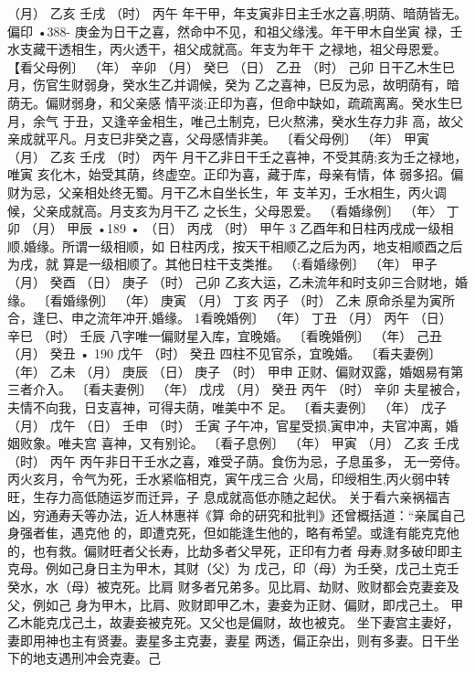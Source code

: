 （月） 乙亥
壬戌
（时） 丙午
年干甲，年支寅非日主壬水之喜,明荫、暗荫皆无。偏印
•388-
庚金为日干之喜，然命中不见，和祖父缘浅。年干甲木自坐寅
禄，壬水支藏干透相生，丙火透干，祖父成就高。年支为年干
之禄地，祖父母恩爱。
【看父母例〕
（年） 辛卯
（月） 癸巳
（日） 乙丑
（时） 己卯
日干乙木生巳月，伤官生财弱身，癸水生乙并调候，癸为
乙之喜神，巳反为忌，故明荫有，暗荫无。偏财弱身，和父亲感
情平淡;正印为喜，但命中缺如，疏疏离离。癸水生巳月，余气
于丑，又逢辛金相生，唯己土制克，巳火熬沸，癸水生存力非
高，故父亲成就平凡。月支巳非癸之喜，父母感情非美。
〔看父母例〕
（年） 甲寅
（月） 乙亥
壬戌
（时） 丙午
月干乙非日干壬之喜神，不受其荫;亥为壬之禄地，唯寅
亥化木，始受其荫，终虚空。正印为喜，藏于库，母亲有情，体
弱多招。偏财为忌，父亲相处终无蜀。月干乙木自坐长生，年
支羊刃，壬水相生，丙火调候，父亲成就高。月支亥为月干乙
之长生，父母恩爱。
（看婚缘例〕
（年〉 丁卯
（月） 甲辰
•189 •
（日） 丙戌
（时） 甲午 3
乙酉年和日柱丙戌成一级相顺,婚缘。所谓一级相顺，如
日柱丙戌，按天干相顺乙之后为丙，地支相顺酉之后为戌，就
算是一级相顺了。其他日柱干支类推。
（:看婚缘例〕
（年） 甲子
（月） 癸酉
（日） 庚子
（时） 己卯
乙亥大运，乙未流年和时支卯三合财地，婚缘。
〔看婚缘例〕
（年） 庚寅
（月） 丁亥
丙子
（时） 乙未
原命杀星为寅所合，逢巳、申之流年冲开,婚缘。
1看晚婚例〕
（年） 丁丑
（月） 丙午
（日） 辛巳
（时） 壬辰
八字唯一偏财星入库，宜晚婚。
〔看晚婚例〕
（年） 己丑
（月） 癸丑
• 190
戊午
（时） 癸丑
四柱不见官杀，宜晚婚。
〔看夫妻例〕
（年） 乙未
（月） 庚辰
（日） 庚子
（时） 甲申
正财、偏财双露，婚姻易有第三者介入。
〔看夫妻例〕
（年） 戊戌
（月） 癸丑
丙午
（时） 辛卯
夫星被合，夫情不向我，日支喜神，可得夫荫，唯美中不
足。
〔看夫妻例〕
（年） 戊子
（月） 戊午
（日） 壬申
（时） 壬寅
子午冲，官星受损,寅申冲，夫官冲离，婚姻败象。唯夫宫
喜神，又有别论。
〔看子息例〕
（年） 甲寅
（月） 乙亥
壬戌
（时） 丙午
丙午非日干壬水之喜，难受子荫。食伤为忌，子息虽多，
无一旁侍。丙火亥月，令气为死，壬水紧临相克，寅午戌三合
火局，印绶相生,丙火弱中转旺，生存力高低随运岁而迁异，子
息成就高低亦随之起伏。
关于看六亲祸福吉凶，穷通寿夭等办法，近人林惠祥《算
命的研究和批判》还曾概括道：“亲属自己身强者隹，遇克他
的，即遭克死，但如能逢生他的，略有希望。或逢有能克克他
的，也有救。偏财旺者父长寿，比劫多者父早死，正印有力者
母寿,财多破印即主克母。例如己身日主为甲木，其财（父）为
戊己，印（母）为壬癸，戊己土克壬癸水，水（母）被克死。比肩
财多者兄弟多。见比肩、劫财、败财都会克妻妾及父，例如己
身为甲木，比肩、败财即甲乙木，妻妾为正财、偏财，即戌己土。
甲乙木能克戊己土，故妻妾被克死。又父也是偏财，故也被克。
坐下妻宫主妻好，妻即用神也主有贤妻。妻星多主克妻，妻星
两透，偏正杂出，则有多妻。日干坐下的地支遇刑冲会克妻。己
